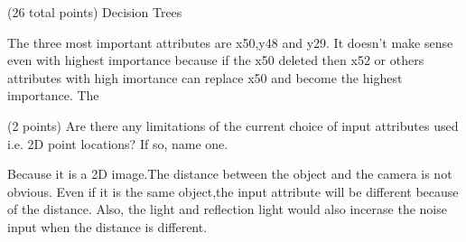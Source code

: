 \documentclass[12pt]{article}
\begin{document}
\begin{question}{(26 total points) Decision Trees}
\begin{subquestion}
\begin{answerbox}{10em}
The three most important attributes are x50,y48 and y29. It doesn't make sense even with highest importance because if the x50 deleted then x52 or others attributes with high imortance can replace x50 and become the highest importance. The 

\end{answerbox}



\end{subquestion}



%
%
\begin{subquestion}{(2 points) 
Are there any limitations of the current choice of input attributes used i.e. 2D point locations? If so, name one. 
}


\begin{answerbox}{10em}
Because it is a 2D image.The distance between the object and the camera is not obvious. Even if it is the same object,the input attribute will be different because of the distance. Also, the light and reflection light would also incerase the noise input when the distance is different.
\end{answerbox}



\end{subquestion}


\end{question}




\clearpage
\end{document}
